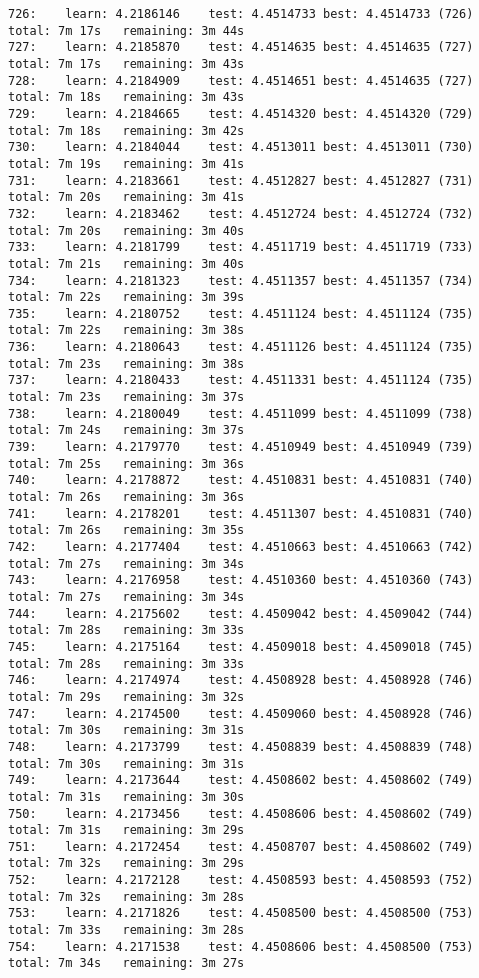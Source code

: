 \documentclass[11pt]{article}
\begin{document}
\begin{Verbatim}[commandchars=\\\{\}]
726:	learn: 4.2186146	test: 4.4514733	best: 4.4514733 (726)	total: 7m 17s	remaining: 3m 44s
727:	learn: 4.2185870	test: 4.4514635	best: 4.4514635 (727)	total: 7m 17s	remaining: 3m 43s
728:	learn: 4.2184909	test: 4.4514651	best: 4.4514635 (727)	total: 7m 18s	remaining: 3m 43s
729:	learn: 4.2184665	test: 4.4514320	best: 4.4514320 (729)	total: 7m 18s	remaining: 3m 42s
730:	learn: 4.2184044	test: 4.4513011	best: 4.4513011 (730)	total: 7m 19s	remaining: 3m 41s
731:	learn: 4.2183661	test: 4.4512827	best: 4.4512827 (731)	total: 7m 20s	remaining: 3m 41s
732:	learn: 4.2183462	test: 4.4512724	best: 4.4512724 (732)	total: 7m 20s	remaining: 3m 40s
733:	learn: 4.2181799	test: 4.4511719	best: 4.4511719 (733)	total: 7m 21s	remaining: 3m 40s
734:	learn: 4.2181323	test: 4.4511357	best: 4.4511357 (734)	total: 7m 22s	remaining: 3m 39s
735:	learn: 4.2180752	test: 4.4511124	best: 4.4511124 (735)	total: 7m 22s	remaining: 3m 38s
736:	learn: 4.2180643	test: 4.4511126	best: 4.4511124 (735)	total: 7m 23s	remaining: 3m 38s
737:	learn: 4.2180433	test: 4.4511331	best: 4.4511124 (735)	total: 7m 23s	remaining: 3m 37s
738:	learn: 4.2180049	test: 4.4511099	best: 4.4511099 (738)	total: 7m 24s	remaining: 3m 37s
739:	learn: 4.2179770	test: 4.4510949	best: 4.4510949 (739)	total: 7m 25s	remaining: 3m 36s
740:	learn: 4.2178872	test: 4.4510831	best: 4.4510831 (740)	total: 7m 26s	remaining: 3m 36s
741:	learn: 4.2178201	test: 4.4511307	best: 4.4510831 (740)	total: 7m 26s	remaining: 3m 35s
742:	learn: 4.2177404	test: 4.4510663	best: 4.4510663 (742)	total: 7m 27s	remaining: 3m 34s
743:	learn: 4.2176958	test: 4.4510360	best: 4.4510360 (743)	total: 7m 27s	remaining: 3m 34s
744:	learn: 4.2175602	test: 4.4509042	best: 4.4509042 (744)	total: 7m 28s	remaining: 3m 33s
745:	learn: 4.2175164	test: 4.4509018	best: 4.4509018 (745)	total: 7m 28s	remaining: 3m 33s
746:	learn: 4.2174974	test: 4.4508928	best: 4.4508928 (746)	total: 7m 29s	remaining: 3m 32s
747:	learn: 4.2174500	test: 4.4509060	best: 4.4508928 (746)	total: 7m 30s	remaining: 3m 31s
748:	learn: 4.2173799	test: 4.4508839	best: 4.4508839 (748)	total: 7m 30s	remaining: 3m 31s
749:	learn: 4.2173644	test: 4.4508602	best: 4.4508602 (749)	total: 7m 31s	remaining: 3m 30s
750:	learn: 4.2173456	test: 4.4508606	best: 4.4508602 (749)	total: 7m 31s	remaining: 3m 29s
751:	learn: 4.2172454	test: 4.4508707	best: 4.4508602 (749)	total: 7m 32s	remaining: 3m 29s
752:	learn: 4.2172128	test: 4.4508593	best: 4.4508593 (752)	total: 7m 32s	remaining: 3m 28s
753:	learn: 4.2171826	test: 4.4508500	best: 4.4508500 (753)	total: 7m 33s	remaining: 3m 28s
754:	learn: 4.2171538	test: 4.4508606	best: 4.4508500 (753)	total: 7m 34s	remaining: 3m 27s

\end{Verbatim}
\end{document}
